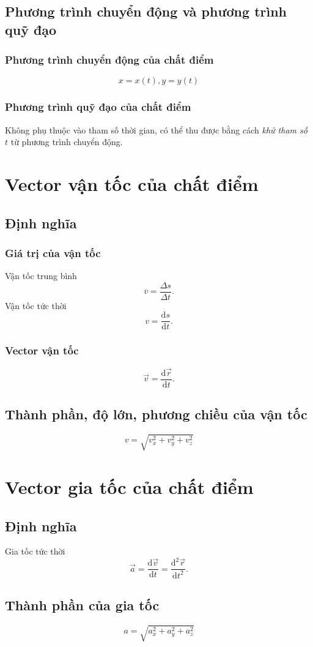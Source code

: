 \subsection{Phương trình chuyển động và phương trình quỹ đạo}
\subsubsection{Phương trình chuyển động của chất điểm}
$$x = x \left( t \right), y = y \left( t \right)$$
\subsubsection{Phương trình quỹ đạo của chất điểm}
Không phụ thuộc vào tham số thời gian, có thể thu được bằng cách \textit{khử tham số $t$} từ phương trình chuyển động.
\section{Vector vận tốc của chất điểm}
\subsection{Định nghĩa}
\subsubsection{Giá trị của vận tốc}
Vận tốc trung bình
$$\overline v  = \frac{{\Delta s}}{{\Delta t}}.$$
Vận tốc tức thời
$$v = \frac{\mathrm{d}s}{\mathrm{d}t}.$$
\subsubsection{Vector vận tốc}
$$\overrightarrow{v} = \frac{\mathrm{d}\overrightarrow{r}}{\mathrm{d}t}.$$
\subsection{Thành phần, độ lớn, phương chiều của vận tốc}
$$v = \sqrt{v_x^2 + v_y^2 + v_z^2}$$
\section{Vector gia tốc của chất điểm}
\subsection{Định nghĩa}
Gia tốc tức thời
$$\overrightarrow{a} = \frac{\mathrm{d}\overrightarrow{v}}{\mathrm{d}t} = \frac{\mathrm{d}^2 \overrightarrow{r}}{\mathrm{d}{t^2}}.$$
\subsection{Thành phần của gia tốc}
$$a = \sqrt{a_x^2 + a_y^2 + a_z^2}$$
